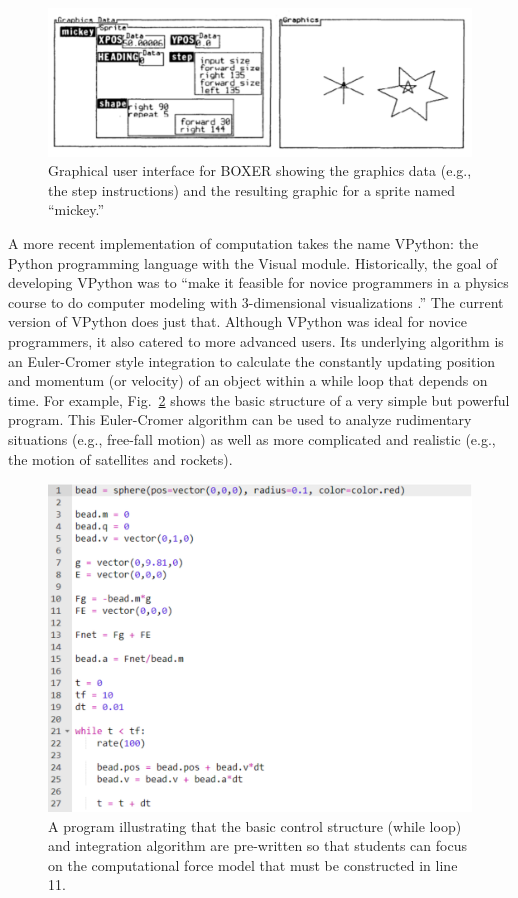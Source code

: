 \documentclass{msuphddissertation}
\begin{document}
\begin{doublespace}
\begin{figure}\center
\includegraphics[scale=0.75]{images/CH2BOXER.pdf}
\caption{Graphical user interface for BOXER showing the graphics data (e.g., the step instructions) and the resulting graphic for a sprite named ``mickey.''}\label{CH2:BOXER}
\end{figure}

A more recent implementation of computation takes the name VPython: the Python programming language with the Visual module.  Historically, the goal of developing VPython was to ``make it feasible for novice programmers in a physics course to do computer modeling with 3-dimensional visualizations \cite{Sherer2000}.''  The current version of VPython does just that.  Although VPython was ideal for novice programmers, it also catered to more advanced users.  Its underlying algorithm is an Euler-Cromer style integration to calculate the constantly updating position and momentum (or velocity) of an object within a while loop that depends on time.  For example, Fig.~\ref{CH2:MWP} shows the basic structure of a very simple but powerful program.  This Euler-Cromer algorithm can be used to analyze rudimentary situations (e.g., free-fall motion) as well as more complicated and realistic (e.g., the motion of satellites and rockets).

\begin{figure}\center
\includegraphics[scale=0.60]{images/CH2MWP.pdf}
\caption{A program illustrating that the basic control structure (while loop) and integration algorithm are pre-written so that students can focus on the computational force model that must be constructed in line 11.}\label{CH2:MWP}
\end{figure}


\end{doublespace}
\end{document}
